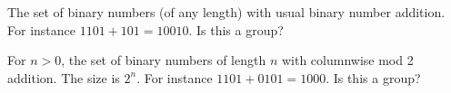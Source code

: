 \mbox{}
\begin{myenum}
\item The set of binary numbers (of any length) with usual
    binary number addition.
    For instance $1101 + 101 = 10010$.
    Is this a group?
  \item For $n > 0$, the set of binary numbers of length $n$ with
    columnwise mod 2 addition. The size is $2^n$.
    For instance $1101 + 0101 = 1000$.
    Is this a group?
    \end{myenum}
